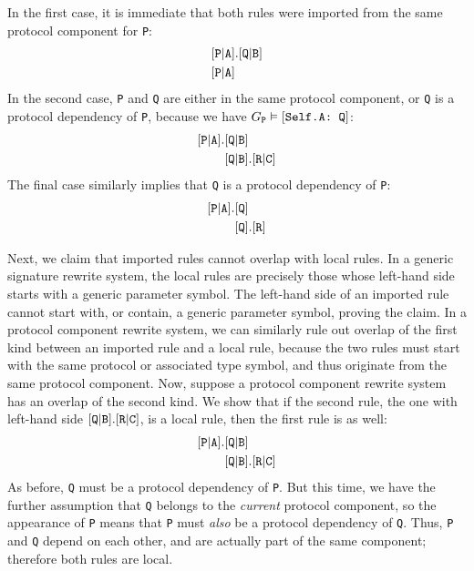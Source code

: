 \documentclass[../generics]{subfiles}
\begin{document}
In the first case, it is immediate that both rules were imported from the same protocol component for \texttt{P}:
\begin{align*}
&[\texttt{P}|\texttt{A}].[\texttt{Q}|\texttt{B}]\\
&[\texttt{P}|\texttt{A}]
\end{align*}
In the second case, \texttt{P} and \texttt{Q} are either in the same protocol component, or \texttt{Q} is a protocol dependency of \texttt{P}, because we have $G_\texttt{P}\vDash[\texttt{Self.A:~Q}]$:
\begin{align*}
[\texttt{P}|\texttt{A}].&[\texttt{Q}|\texttt{B}]\\
&[\texttt{Q}|\texttt{B}].[\texttt{R}|\texttt{C}]
\end{align*}
The final case similarly implies that \texttt{Q} is a protocol dependency of \texttt{P}:
\begin{align*}
[\texttt{P}|\texttt{A}].&[\texttt{Q}]\\
&[\texttt{Q}].[\texttt{R}]
\end{align*}

Next, we claim that imported rules cannot overlap with local rules. In a generic signature rewrite system, the local rules are precisely those whose left-hand side starts with a generic parameter symbol. The left-hand side of an imported rule cannot start with, or contain, a generic parameter symbol, proving the claim. In a protocol component rewrite system, we can similarly rule out overlap of the first kind between an imported rule and a local rule, because the two rules must start with the same protocol or associated type symbol, and thus originate from the same protocol component. Now, suppose a protocol component rewrite system has an overlap of the second kind. We show that if the second rule, the one with left-hand side $[\texttt{Q}|\texttt{B}].[\texttt{R}|\texttt{C}]$, is a local rule, then the first rule is as well:
\begin{align*}
[\texttt{P}|\texttt{A}].&[\texttt{Q}|\texttt{B}]\\
&[\texttt{Q}|\texttt{B}].[\texttt{R}|\texttt{C}]
\end{align*}
As before, \texttt{Q} must be a protocol dependency of \texttt{P}. But this time, we have the further assumption that \texttt{Q} belongs to the \emph{current} protocol component, so the appearance of \texttt{P} means that \texttt{P} must \emph{also} be a protocol dependency of \texttt{Q}. Thus, \texttt{P} and \texttt{Q} depend on each other, and are actually part of the same component; therefore both rules are local.
\end{document}
